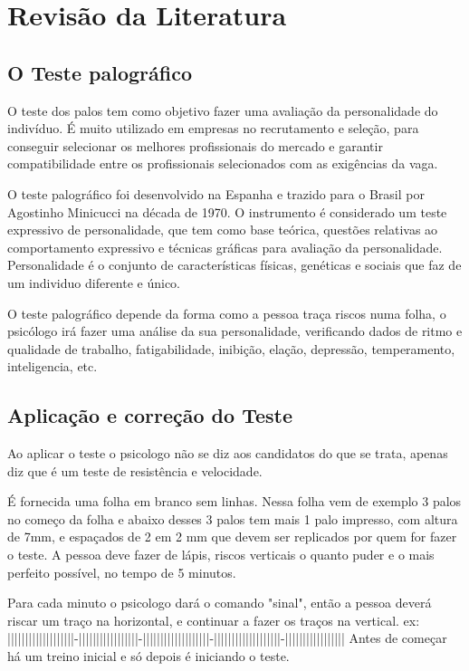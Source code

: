 \chapter{Revisão da Literatura}
\label{cap:descr}

\section{O Teste palográfico}
\label{sec:testep}
O teste dos palos tem como objetivo fazer uma avaliação da personalidade do indivíduo. É muito utilizado em empresas no recrutamento e seleção, para conseguir selecionar os melhores profissionais do mercado e garantir compatibilidade entre os profissionais selecionados com as exigências da vaga. 

O teste palográfico foi desenvolvido na Espanha e trazido para o Brasil por Agostinho Minicucci na década de 1970. O instrumento é considerado um teste expressivo de personalidade,  que tem como base teórica, questões relativas ao comportamento expressivo e técnicas gráficas para avaliação da personalidade.\cite{ibapnet2012} Personalidade é o conjunto de características  físicas, genéticas e sociais que faz de um individuo diferente e único. \cite{dicio2018}

O teste palográfico depende da forma como a pessoa traça riscos numa folha, o psicólogo irá fazer uma análise da sua personalidade, verificando dados de ritmo e qualidade de trabalho, fatigabilidade, inibição, elação, depressão, temperamento, inteligencia, etc. \cite{manualPsico2010}

\section{Aplicação e correção do Teste}
\label{sec:formateste}
Ao aplicar o teste o psicologo não se diz aos candidatos do que se trata, apenas diz que é um teste de resistência e velocidade.

É fornecida uma folha em branco sem linhas. Nessa folha vem de exemplo 3 palos no começo da folha e abaixo desses 3 palos tem mais 1 palo impresso, com altura de 7mm,  e espaçados de 2 em 2 mm que devem ser replicados por quem for fazer o teste. A pessoa deve fazer de lápis, riscos verticais o quanto puder e o mais perfeito possível, no tempo de 5 minutos. \cite{manualPsico2010}

Para cada minuto o psicologo dará o comando "sinal", então a pessoa deverá riscar um traço na horizontal, e continuar a fazer os traços na vertical. ex:
|||||||||||||||||||-|||||||||||||||||-|||||||||||||||||||-|||||||||||||||||||-|||||||||||||||||
Antes de começar há um treino inicial e só depois é iniciando o teste. \cite{manualPsico2010}

